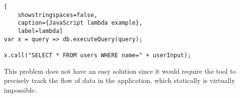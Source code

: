 \begin{lstlisting}[
    showstringspaces=false,
    caption={JavaScript lambda example},
    label=lambda]
var x = query => db.executeQuery(query);

x.call("SELECT * FROM users WHERE name=" + userInput);
\end{lstlisting}

This problem does not have an easy solution since it would require the tool to precisely track the flow of data in the application, which statically is virtually impossible.